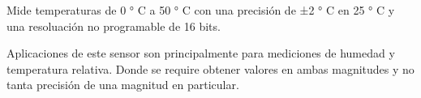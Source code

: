 \begin{itemize}
			\par \noindent
				Mide temperaturas de 0 ° C a 50 ° C con una precisión de ±2 ° C en 25 ° C y una resoluación no programable de 16 bits.
				
			\par \noindent
				Aplicaciones de este sensor son principalmente para mediciones de humedad y temperatura relativa. Donde se require obtener valores en ambas magnitudes y no tanta precisión de una magnitud en particular. 
			
		
		
	\end{itemize}
